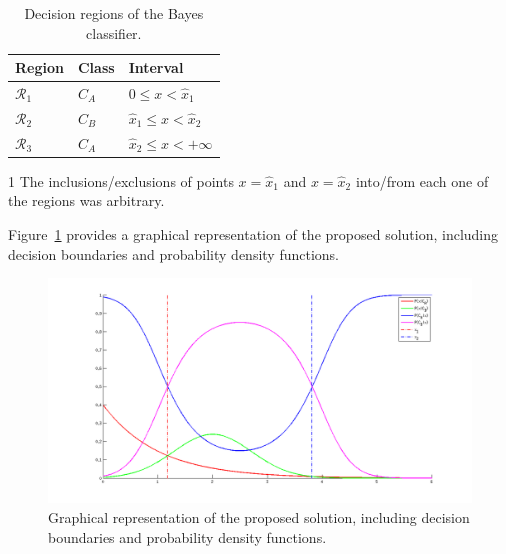 \documentclass[paper=a4, fontsize=11pt]{scrartcl} %
\numberwithin{equation}{section} %
\numberwithin{figure}{section} %
\numberwithin{table}{section} %
\begin{document}
\begin{table}[H]
\begin{center}
    \begin{threeparttable}
    \small
        \begin{tabularx}{0.60\textwidth}{ X | X | X  }
            \textbf{Region}     & \textbf{Class} & \textbf{Interval\tnote{1}}\\ [0.5ex]
            \hline
            $\mathcal{R}_{1}$   & $C_A$ & $ 0 \le x < \hat{x}_1$ \\ [0.5ex]
            $\mathcal{R}_{2}$   & $C_B$ & $ \hat{x}_1 \le x < \hat{x}_2$\\ [0.5ex]
            $\mathcal{R}_{3}$   & $C_A$ & $ \hat{x}_2 \le x < +\infty$\\ [0.5ex]
        \end{tabularx}

        \begin{tablenotes}
            \footnotesize
            \item[1]The inclusions\slash exclusions of points $x = \hat{x}_1$ 
            and $x = \hat{x}_2$ into\slash from each one of the regions was 
            arbitrary.
        \end{tablenotes}
    \caption{Decision regions of the Bayes classifier.}
    \label{tab:3-1-class-ass}
    \end{threeparttable}
    \end{center}
\end{table}

Figure~\ref{fig:3-1} provides a graphical representation of the proposed 
solution, including decision boundaries and probability 
density functions.

\begin{figure}[H]

    \centering
    \includegraphics[width=1.00\textwidth]{figures/3-1.png}
    \caption{Graphical representation of the proposed 
solution, including decision boundaries and probability 
density functions.}
    \label{fig:3-1}

\end{figure}
\end{document}
